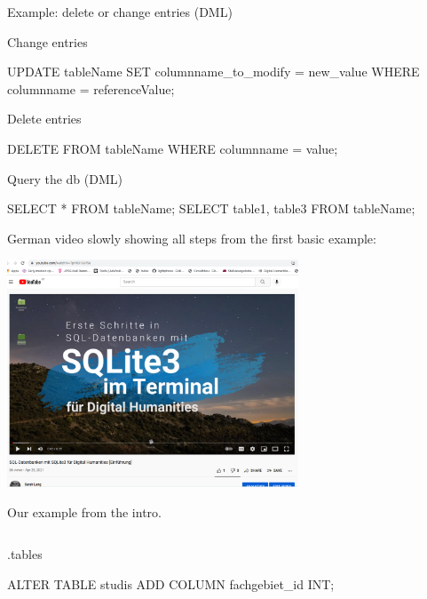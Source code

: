 \begin{frame}{Example: delete or change entries (DML) }
\begin{block}{Change entries}
    \begin{sqlcode}
UPDATE tableName 
SET columnname_to_modify = new_value
WHERE columnname = referenceValue;
\end{sqlcode}
\end{block}

\begin{block}{Delete entries}
  \begin{sqlcode}
DELETE FROM tableName 
WHERE columnname = value;
\end{sqlcode}
\end{block}

\framebreak

\begin{block}{Query the db (DML) }
  \begin{sqlcode}
SELECT * FROM tableName;
SELECT table1, table3 FROM tableName;
\end{sqlcode}
\end{block}

\framebreak

German video slowly showing all steps from the first basic example: 

\includegraphics[width=0.65\textwidth]{img/sql-basics-video-youtube.png}

\framebreak

Our example from the intro.

\begin{columns}
\begin{sqlcode}
.tables

ALTER TABLE studis
ADD COLUMN fachgebiet_id INT;


\end{sqlcode}
\end{columns}
\end{frame}
